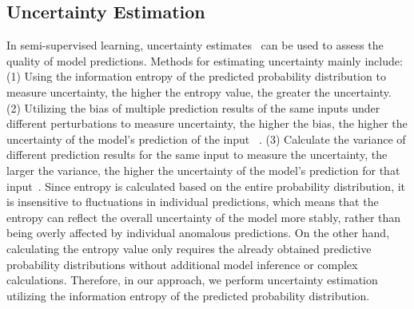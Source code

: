 \subsection{Uncertainty Estimation}
In semi-supervised learning, uncertainty estimates~\cite{NIPS2017_2650d608,shi2021inconsistency,mehrtash2020confidence} can be used to assess the quality of model predictions. Methods for estimating uncertainty mainly include: (1) Using the information entropy of the predicted probability distribution to measure uncertainty, the higher the entropy value, the greater the uncertainty. (2) Utilizing the bias of multiple prediction results of the same inputs under different perturbations to measure uncertainty, the higher the bias, the higher the uncertainty of the model's prediction of the input ~\cite{yu2019uncertainty}. (3) Calculate the variance of different prediction results for the same input to measure the uncertainty, the larger the variance, the higher the uncertainty of the model's prediction for that input~\cite{zheng2021rectifying}. Since entropy is calculated based on the entire probability distribution, it is insensitive to fluctuations in individual predictions, which means that the entropy can reflect the overall uncertainty of the model more stably, rather than being overly affected by individual anomalous predictions. On the other hand, calculating the entropy value only requires the already obtained predictive probability distributions without additional model inference or complex calculations. Therefore, in our approach, we perform uncertainty estimation utilizing the information entropy of the predicted probability distribution.